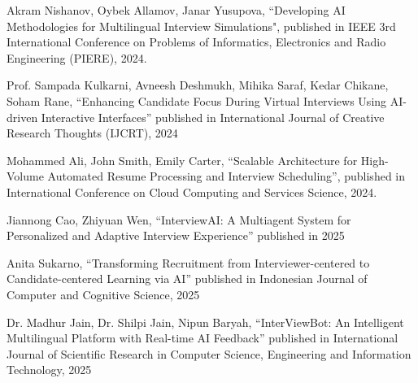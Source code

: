 \documentclass[12pt]{article}
\begin{document}
\begin{enumerate}[label={[{\arabic*}]}, leftmargin=1cm]
\item Akram Nishanov, Oybek Allamov, Janar Yusupova, ``Developing AI Methodologies for Multilingual Interview Simulations", published in IEEE 3rd International Conference on Problems of Informatics, Electronics and Radio Engineering (PIERE), 2024.

\item Prof. Sampada Kulkarni, Avneesh Deshmukh, Mihika Saraf, Kedar Chikane, Soham Rane, “Enhancing Candidate Focus During Virtual Interviews Using AI-driven Interactive Interfaces” published in International Journal of Creative Research Thoughts (IJCRT), 2024

\item Mohammed Ali, John Smith, Emily Carter, “Scalable Architecture for High-Volume Automated Resume Processing and Interview Scheduling”, published in International Conference on Cloud Computing and Services Science, 2024.

\item Jiannong Cao, Zhiyuan Wen, “InterviewAI: A Multiagent System for Personalized and Adaptive Interview Experience” published in 2025

\item Anita Sukarno, “Transforming Recruitment from Interviewer-centered to Candidate-centered Learning via AI” published in Indonesian Journal of Computer and Cognitive Science, 2025

\item Dr. Madhur Jain, Dr. Shilpi Jain, Nipun Baryah, “InterViewBot: An Intelligent Multilingual Platform with Real-time AI Feedback” published in International Journal of Scientific Research in Computer Science, Engineering and Information Technology, 2025

\end{enumerate}
\end{document}
